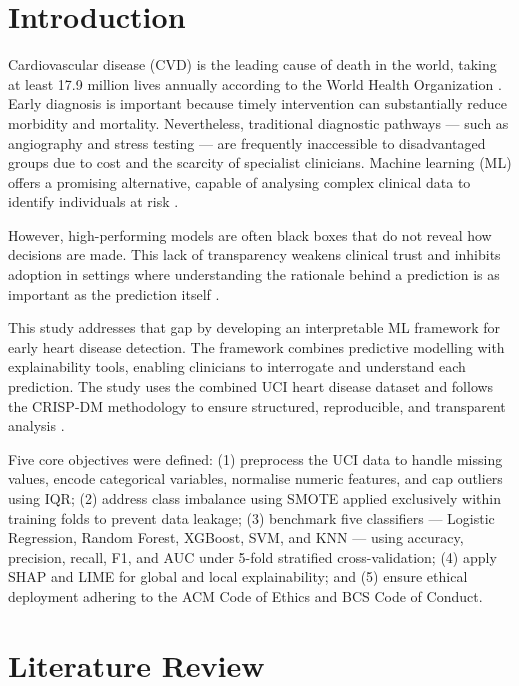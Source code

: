\documentclass[conference]{IEEEtran}
\begin{document}
\section{Introduction}

Cardiovascular disease (CVD) is the leading cause of death in the world, taking at least 17.9 million lives annually according to the World Health Organization \cite{who2025}. Early diagnosis is important because timely intervention can substantially reduce morbidity and mortality. Nevertheless, traditional diagnostic pathways — such as angiography and stress testing — are frequently inaccessible to disadvantaged groups due to cost and the scarcity of specialist clinicians. Machine learning (ML) offers a promising alternative, capable of analysing complex clinical data to identify individuals at risk \cite{hassija2023}.

However, high-performing models are often black boxes that do not reveal how decisions are made. This lack of transparency weakens clinical trust and inhibits adoption in settings where understanding the rationale behind a prediction is as important as the prediction itself \cite{banerjee2025}.

This study addresses that gap by developing an interpretable ML framework for early heart disease detection. The framework combines predictive modelling with explainability tools, enabling clinicians to interrogate and understand each prediction. The study uses the combined UCI heart disease dataset and follows the CRISP-DM methodology to ensure structured, reproducible, and transparent analysis \cite{desai2022}.

Five core objectives were defined: (1) preprocess the UCI data to handle missing values, encode categorical variables, normalise numeric features, and cap outliers using IQR; (2) address class imbalance using SMOTE applied exclusively within training folds to prevent data leakage; (3) benchmark five classifiers — Logistic Regression, Random Forest, XGBoost, SVM, and KNN — using accuracy, precision, recall, F1, and AUC under 5-fold stratified cross-validation; (4) apply SHAP and LIME for global and local explainability; and (5) ensure ethical deployment adhering to the ACM Code of Ethics and BCS Code of Conduct.

\section{Literature Review}
\end{document}
